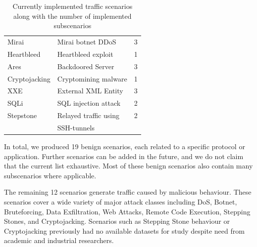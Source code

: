 \documentclass[runningheads]{llncs}
\begin{document}
\begin{table}
\begin{tabular}[t]{l|l|r}
 Mirai & Mirai botnet DDoS & 3\\
 Heartbleed & Heartbleed exploit & 1\\
 Ares & Backdoored Server & 3\\
 Cryptojacking & Cryptomining malware & 1\\
 XXE & External XML Entity & 3\\
 SQLi & SQL injection attack & 2 \\
 Stepstone & Relayed traffic using & 2\\
 &SSH-tunnels&\\
 \hline
\end{tabular}
\vspace{0.1cm} 
\caption{Currently implemented traffic scenarios along with the number of implemented subscenarios}
\vspace{-1cm} 
\label{tab:scen}
\end{table}



In total, we produced 19 benign scenarios, each related to a specific protocol or application. Further scenarios can be added in the future, and we do not claim that the current list exhaustive. Most of these benign scenarios also contain many subscenarios where applicable.

The remaining 12 scenarios generate traffic caused by malicious behaviour. These scenarios cover a wide variety of major attack classes including DoS, Botnet, Bruteforcing, Data Exfiltration, Web Attacks, Remote Code Execution, Stepping Stones, and Cryptojacking. 
Scenarios such as Stepping Stone behaviour or Cryptojacking previously had no available datasets for study despite need from academic and industrial researchers.








\end{document}
